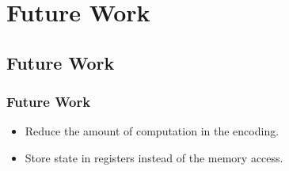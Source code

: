 \section{Future Work}

\subsection{Future Work}
\begin{frame}
  \frametitle{Future Work}
  \begin{itemize}
    \setlength\itemsep{1em}
  \item
    Reduce the amount of computation in the encoding.
  \item
    Store state in registers instead of the memory access.
  \end{itemize}
\end{frame}
